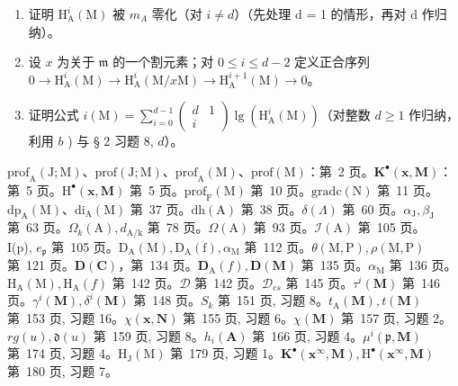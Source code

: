 \begin{enumerate}
\def\labelenumi{\alph{enumi})}
\item
  证明 \(\mathrm{H}_{\mathrm{A}}^{i}(\mathrm{M})\) 被 \(m_{A}\) 零化（对 \(i \neq d\)）（先处理 d = 1 的情形，再对 d 作归纳）。
\item
  设 \(x\) 为关于 \(\mathfrak{m}\) 的一个割元素；对 \(0 \leqslant i \leqslant d - 2\) 定义正合序列 \(0 \to \mathrm{H}_{\mathrm{A}}^{i}(\mathrm{M}) \to \mathrm{H}_{\mathrm{A}}^{i}(\mathrm{M}/x\mathrm{M}) \to \mathrm{H}_{\mathrm{A}}^{i+1}(\mathrm{M}) \to 0\)。
\item
  证明公式 \(i(\mathrm{M}) = \sum_{i=0}^{d-1} \left( \begin{array}{cc} d & 1 \\ i & \end{array} \right) \lg(\mathrm{H}_{\mathrm{A}}^i(\mathrm{M}))\)（对整数 \(d \geqslant 1\) 作归纳，利用 \(b\) ) 与 § 2 习题 8, \(d\)）。
\end{enumerate}


\(\mathrm{prof}_{\mathrm{A}}(\mathrm{J};\mathrm{M})\)、\(\mathrm{prof}(\mathrm{J};\mathrm{M})\)、\(\mathrm{prof}_{\mathrm{A}}(\mathrm{M})\)、\(\mathrm{prof}(\mathrm{M})\)：第~2 页。\(\mathbf{K}^{\bullet}(\mathbf{x},\mathbf{M})\)：第~5 页。\(\mathrm{H}^{\bullet}(\mathbf{x},\mathbf{M})\) 第~5 页。\(\mathrm{prof}_{\mathrm{F}}(\mathrm{M})\) 第~10 页。\(\mathrm{gradc}(\mathrm{N})\) 第~11 页。\(\mathrm{dp}_{\mathrm{A}}(\mathrm{M})\)、\(\mathrm{di}_{\mathrm{A}}(\mathrm{M})\) 第~37 页。\(\mathrm{dh(A)}\) 第~38 页。\(\delta (\Lambda)\) 第~60 页。\(\alpha_{\mathrm{J}},\beta_{\mathrm{J}}\) 第~63 页。\(\Omega_k(\mathrm{A}),d_{\mathrm{A / k}}\) 第~78 页。\(\Omega (\mathrm{A})\) 第~93 页。\(\mathcal{I}(\mathrm{A})\) 第~105 页。\\
I(p), \(e_{\mathfrak{p}}\) 第~105 页。\(\mathrm{D_A(M),D_A(f),}\alpha_{\mathrm{M}}\) 第~112 页。\(\theta (\mathrm{M},\mathrm{P}),\rho (\mathrm{M},\mathrm{P})\) 第~121 页。\(\mathbf{D}(\mathbf{C})\)，第~134 页。\(\mathbf{D}_{\mathrm{A}}(f),\mathbf{D}(\mathbf{M})\) 第~135 页。\(\alpha_{\mathrm{M}}\) 第~136 页。\(\mathrm{H}_{\mathrm{A}}(\mathrm{M}),\mathrm{H}_{\mathrm{A}}(f)\) 第~142 页。\(\mathcal{D}\) 第~142 页。\(\mathcal{D}_{cs}\) 第~145 页。\(\tau^i (\mathbf{M})\) 第~146 页。\(\gamma^i (\mathbf{M}),\delta^i (\mathbf{M})\) 第~148 页。\(S_{k}\) 第~151 页, 习题 8。\(t_\mathrm{A}(\mathbf{M}),t(\mathbf{M})\) 第~153 页, 习题 16。\(\chi (\mathbf{x},\mathbf{N})\) 第~155 页, 习题 6。\(\chi (\mathbf{M})\) 第~157 页, 习题 2。\(rg(u),\mathfrak{d}(u)\) 第~159 页, 习题 8。\(h_i(\mathbf{A})\) 第~166 页, 习题 4。\(\mu^i (\mathfrak{p},\mathbf{M})\) 第~174 页, 习题 4。\(\mathrm{H}_{\mathrm{J}}(\mathrm{M})\) 第~179 页, 习题 1。\(\mathbf{K}^{\bullet}(\mathbf{x}^{\infty},\mathbf{M}),\mathrm{H}^{\bullet}(\mathbf{x}^{\infty},\mathbf{M})\) 第~180 页, 习题 7。

